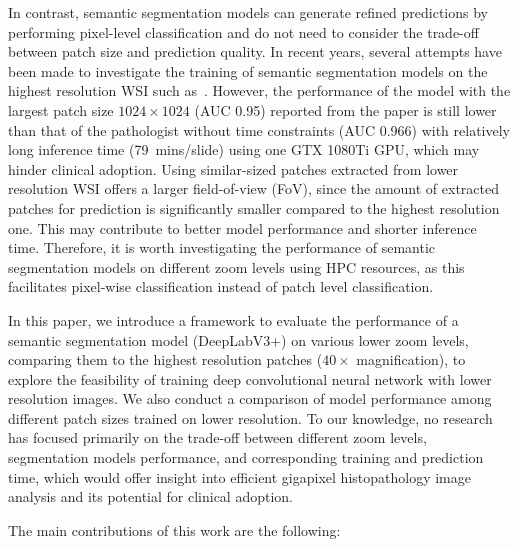 In contrast, semantic segmentation models can generate refined predictions by performing pixel-level classification and do not need to consider the trade-off between patch size and prediction quality. In recent years, several attempts have been made to investigate the training of semantic segmentation models on the highest resolution WSI such as~\cite{Guo2019}. However, the performance of the model with the largest patch size $1024\times1024$ (AUC 0.95) reported from the paper is still lower than that of the pathologist without time constraints (AUC 0.966) with relatively long inference time (79~mins/slide) using one GTX 1080Ti GPU, which may hinder clinical adoption. Using similar-sized patches extracted from lower resolution WSI offers a larger field-of-view (FoV), since the amount of extracted patches for prediction is significantly smaller compared to the highest resolution one. This may contribute to better model performance and shorter inference time. Therefore, it is worth investigating the performance of semantic segmentation models on different zoom levels using HPC resources, as this facilitates pixel-wise classification instead of patch level classification.  

In this paper, we introduce a framework to evaluate the performance of a semantic segmentation model (DeepLabV3+) on various lower zoom levels, comparing them to the highest resolution patches ($40\times$ magnification), to explore the feasibility of training deep convolutional neural network with lower resolution images. We also conduct a comparison of model performance among different patch sizes trained on lower resolution. To our knowledge, no research has focused primarily on the trade-off between different zoom levels, segmentation models performance, and corresponding training and prediction time, which would offer insight into efficient gigapixel histopathology image analysis and its potential for clinical adoption.

The main contributions of this work are the following:

